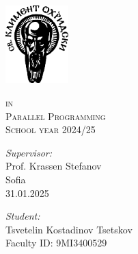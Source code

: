 \begin{titlepage}
    \begin{center}
        \vspace*{-2.3cm}
        \includegraphics[height=3cm]{resources/su_logo.png}

        \vspace*{.06\textheight}
        {\scshape\large \univname\par}\vspace{2.5cm}

        {\huge \bfseries{\thetitle}\par}\vspace{0.7cm}
        \textsc{\small in }\\[0.6cm]
        \textsc{\Large Parallel Programming}\\[0.5cm]\vspace{0.5cm}
        \textsc{\normalsize School year 2024/25}\\[0.6cm]\vspace{2.2cm}


        \begin{minipage}[t]{0.4\textwidth}
            \begin{flushleft} \large
                \emph{Supervisor:}\\[0.7cm]
                Prof. Krassen Stefanov\\[0.7cm]
                Sofia\\[0.5cm]
                {\large 31.01.2025}
            \end{flushleft}
        \end{minipage}
        \begin{minipage}[t]{0.4\textwidth}
            \begin{flushright} \large
                \emph{Student:}\\[0.7cm]
                Tsvetelin Kostadinov Tsetskov\\[0.5cm]
                Faculty ID: 9MI3400529\\[0.5cm]
            \end{flushright}
        \end{minipage}

    \end{center}
\end{titlepage}